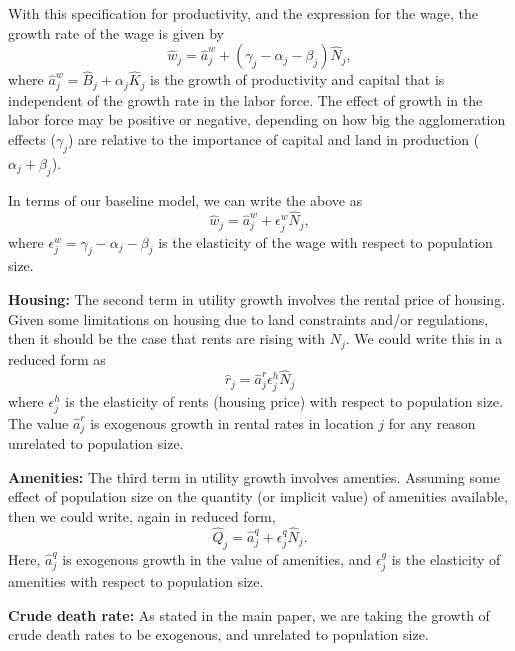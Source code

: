 \documentclass[10pt]{article}
\begin{document}
With this specification for productivity, and the expression for the wage, the growth rate of the wage is given by
\begin{equation}
    \hat{w}_j = \hat{a}^w_j + (\gamma_j - \alpha_j - \beta_j)\hat{N}_j,
\end{equation}
where $\hat{a}^w_j = \hat{B}_j + \alpha_j \hat{K}_j$ is the growth of productivity and capital that is independent of the growth rate in the labor force. The effect of growth in the labor force may be positive or negative, depending on how big the agglomeration effects ($\gamma_j$) are relative to the importance of capital and land in production ($\alpha_j + \beta_j$).

In terms of our baseline model, we can write the above as
\begin{equation}
    \hat{w}_j = \hat{a}^w_j + \epsilon^w_j \hat{N}_j,
\end{equation}
where $\epsilon^w_j = \gamma_j - \alpha_j - \beta_j$ is the elasticity of the wage with respect to population size.

\textbf{Housing:} The second term in utility growth involves the rental price of housing. Given some limitations on housing due to land constraints and/or regulations, then it should be the case that rents are rising with $N_j$. We could write this in a reduced form as
\begin{equation}
    \hat{r}_j = \hat{a}^r_j \epsilon_j^h \hat{N}_j
\end{equation}
where $\epsilon^h_j$ is the elasticity of rents (housing price) with respect to population size. The value $\hat{a}^r_j$ is exogenous growth in rental rates in location $j$ for any reason unrelated to population size. 

\textbf{Amenities:} The third term in utility growth involves amenties. Assuming some effect of population size on the quantity (or implicit value) of amenities available, then we could write, again in reduced form,
\begin{equation}
    \hat{Q}_j = \hat{a}^q_j + \epsilon^q_j \hat{N}_j.
\end{equation}
Here, $\hat{a}^q_j$ is exogenous growth in the value of amenities, and $\epsilon^g_j$ is the elasticity of amenities with respect to population size. 

\textbf{Crude death rate:} As stated in the main paper, we are taking the growth of crude death rates to be exogenous, and unrelated to population size.
\end{document}
